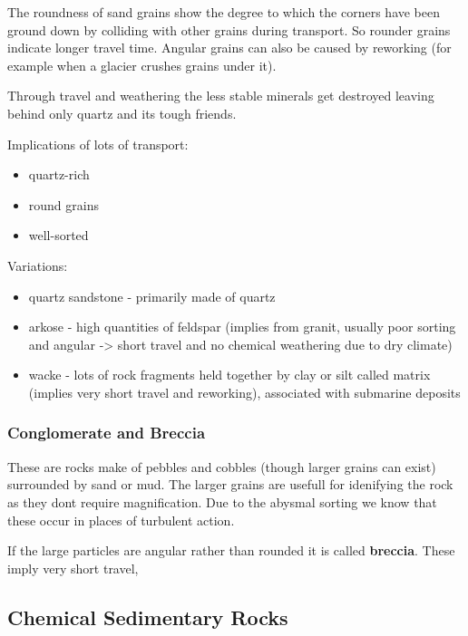 \documentclass{article}
\begin{document}
The roundness of sand grains show the degree to which the corners have been ground down by colliding with other grains during transport. So rounder grains indicate longer travel time. Angular grains can also be caused by reworking (for example when a glacier crushes grains under it).

Through travel and weathering the less stable minerals get destroyed leaving behind only quartz and its tough friends.

Implications of lots of transport:
\begin{itemize}
    \item quartz-rich
    \item round grains
    \item well-sorted
\end{itemize}

Variations:
\begin{itemize}
    \item quartz sandstone - primarily made of quartz
    \item arkose - high quantities of feldspar (implies from granit, usually poor sorting and angular -> short travel and no chemical weathering due to dry climate)
    \item wacke - lots of rock fragments held together by clay or silt called matrix (implies very short travel and reworking), associated with submarine deposits
\end{itemize}

\subsubsection{Conglomerate and Breccia} %
\label{sub:conglomerate_and_breccia}
These are rocks make of pebbles and cobbles (though larger grains can exist) surrounded by sand or mud. The larger grains are usefull for idenifying the rock as they dont require magnification. Due to the abysmal sorting we know that these occur in places of turbulent action.

If the large particles are angular rather than rounded it is called \textbf{breccia}. These imply very short travel,

\subsection{Chemical Sedimentary Rocks} %
\label{sub:chemical_sedimentary_rocks}
\end{document}
